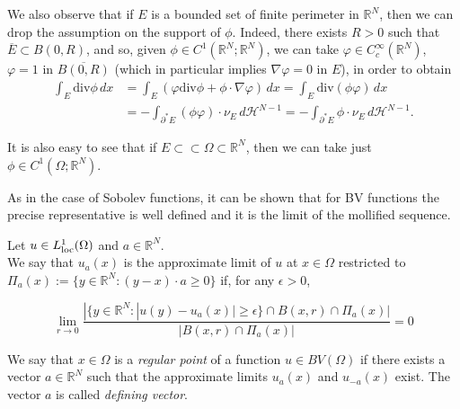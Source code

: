 \begin{remark} \label{G-G fin per bounded} We also observe that if $E$ is a bounded set of finite perimeter in $\mathbb{R}^{N}$, then we can drop the assumption on the support of $\phi$. Indeed, there exists $R > 0$ such that $\overline{E} \subset B(0, R)$, and so, given $\phi \in C^{1}(\mathbb{R}^{N}; \mathbb{R}^{N})$, we can take $\varphi \in C^{\infty}_{c}(\mathbb{R}^{N})$, $\varphi = 1$ in $\overline{B(0, R)}$ (which in particular implies $\nabla \varphi = 0$ in $E$), in order to obtain
\begin{align*} \int_{E} \mathrm{div} \phi \, dx & = \int_{E} (\varphi \mathrm{div}\phi + \phi \cdot \nabla \varphi) \, dx = \int_{E} \mathrm{div}(\phi \varphi) \, dx \\
& = - \int_{\partial^{*} E} (\phi \varphi) \cdot \nu_{E}\, d\mathcal{H}^{N-1} = - \int_{\partial^{*} E} \phi \cdot \nu_{E}\, d\mathcal{H}^{N-1}. 
\end{align*}

It is also easy to see that if $E \subset \subset \Omega \subset \mathbb{R}^{N}$, then we can take just $\phi \in C^{1}(\Omega; \mathbb{R}^{N})$.
\end{remark}

As in the case of Sobolev functions, it can be shown that for BV functions the precise representative is well defined and it is the limit of the mollified sequence.

\begin{definition} \label{approxlimrestr} Let $u \in L^{1}_{\rm loc}(\Omega)$ and $a \in \mathbb{R}^{N}$. 
\\
We say that $u_{a}(x)$ is the approximate limit of $u$ at $x \in \Omega$ restricted to $\Pi_{a}(x) := \{y \in \mathbb{R}^{N} : (y - x) \cdot a \ge 0 \}$ if, for any $\epsilon > 0$,

\[\lim_{r \to 0} \frac{|\{y \in \mathbb{R}^{N} : |u(y) - u_{a}(x)| \ge \epsilon \} \cap B(x,r) \cap \Pi_{a}(x)|}{|B(x,r) \cap \Pi_{a}(x)|} = 0 \]
\end{definition}
\begin{definition} We say that $x \in \Omega$ is a {\em regular point} of a function $u \in BV(\Omega)$ if there exists a vector $a \in \mathbb{R}^{N}$ such that the approximate limits $u_{a}(x)$ and $u_{-a}(x)$ exist. The vector $a$ is called {\em defining vector}.
\end{definition}

